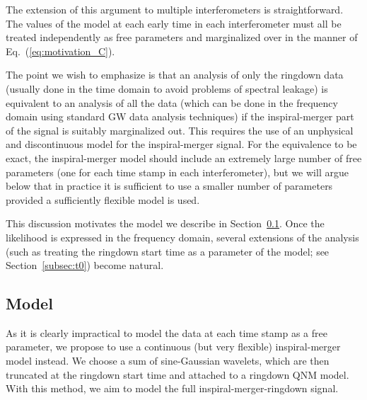 The extension of this argument to multiple interferometers is straightforward. 
The values of the model at each early time in each interferometer must all be treated independently as free parameters and marginalized over in the manner of Eq.~(\ref{eq:motivation_C}).

The point we wish to emphasize is that an analysis of only the ringdown data (usually done in the time domain to avoid problems of spectral leakage) is equivalent to an analysis of all the data (which can be done in the frequency domain using standard GW data analysis techniques) if the inspiral-merger part of the signal is suitably marginalized out. 
This requires the use of an unphysical and discontinuous model for the inspiral-merger signal.
For the equivalence to be exact, the inspiral-merger model should include an extremely large number of free parameters (one for each time stamp in each interferometer), but we will argue below that in practice it is sufficient to use a smaller number of parameters provided a sufficiently flexible model is used.

This discussion motivates the model we describe in Section~\ref{subsec:model}. Once the likelihood is expressed in the frequency domain, several extensions of the analysis (such as treating the ringdown start time as a parameter of the model; see Section~\ref{subsec:t0}) become natural.


\subsection{Model}\label{subsec:model}

As it is clearly impractical to model the data at each time stamp as a free parameter, we propose to use a continuous (but very flexible) inspiral-merger model instead. 
We choose a sum of sine-Gaussian wavelets, which are then truncated at the ringdown start time and attached to a ringdown QNM model. 
With this method, we aim to model the full inspiral-merger-ringdown signal.

